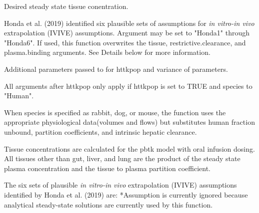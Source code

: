 \documentclass[a4paper]{book}
\begin{document}
\begin{Arguments}
\begin{ldescription}
\item[\code{tissue}] Desired steady state tissue conentration.

\item[\code{IVIVE}] Honda et al. (2019) identified six plausible sets of
assumptions for \emph{in vitro-in vivo} extrapolation (IVIVE) assumptions.
Argument may be set to "Honda1" through "Honda6". If used, this function
overwrites the tissue, restrictive.clearance, and plasma.binding arguments.
See Details below for more information.

\item[\code{...}] Additional parameters passed to  for httkpop and
variance of parameters.
\end{ldescription}
\end{Arguments}
%
\begin{Details}\relax
All arguments after httkpop only apply if httkpop is set to TRUE and species
to "Human".

When species is specified as rabbit, dog, or mouse, the function uses the
appropriate physiological data(volumes and flows) but substitutes human
fraction unbound, partition coefficients, and intrinsic hepatic clearance.

Tissue concentrations are calculated for the pbtk model with oral infusion
dosing.  All tissues other than gut, liver, and lung are the product of the
steady state plasma concentration and the tissue to plasma partition
coefficient.

The six sets of plausible \emph{in vitro-in vivo} extrapolation (IVIVE)
assumptions identified by Honda et al. (2019) are: 
 *Assumption is
currently ignored because analytical steady-state solutions are currently
used by this function.
\end{Details}
\end{document}
